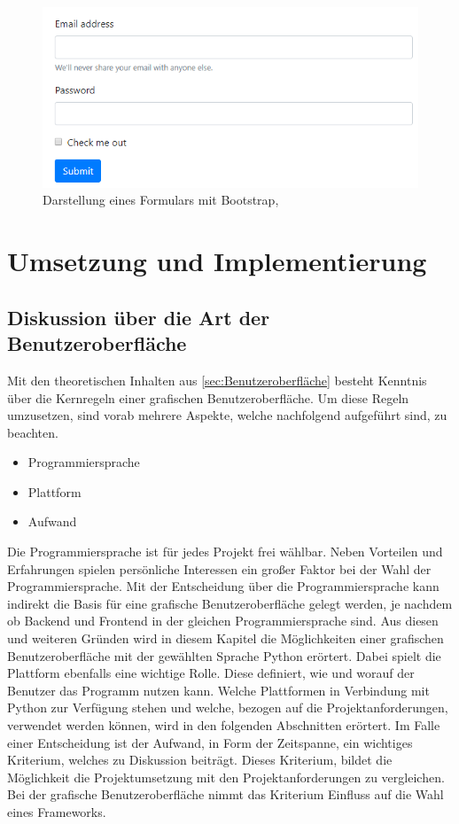 \documentclass[a4paper,titlepage,halfparskip,12pt]{scrreprt}
\begin{document}
\begin{onehalfspacing}
\begin{figure}[h]
	\centering
	\includegraphics[scale=1.0]{images/BootstrapForm}
	\caption{Darstellung eines Formulars mit Bootstrap, \cite{bootstrapOnline}} 
	\label{img:BootstrapForm}
\end{figure}
\pagebreak

\chapter{Umsetzung und Implementierung}
\label{chap:Umsetzung}

\section{Diskussion über die Art der Benutzeroberfläche}
\label{sec:DiskussionGUI}

Mit den theoretischen Inhalten aus \autoref{sec:Benutzeroberfläche} besteht Kenntnis über die Kernregeln einer grafischen Benutzeroberfläche. Um diese Regeln umzusetzen, sind vorab mehrere Aspekte, welche nachfolgend aufgeführt sind, zu beachten.
\begin{itemize}
	\item Programmiersprache
	\item Plattform
	\item Aufwand
\end{itemize}
Die Programmiersprache ist für jedes Projekt frei wählbar. Neben Vorteilen und Erfahrungen spielen persönliche Interessen ein großer Faktor bei der Wahl der Programmiersprache. Mit der Entscheidung über die Programmiersprache kann indirekt die Basis für eine grafische Benutzeroberfläche gelegt werden, je nachdem ob Backend und Frontend in der gleichen Programmiersprache sind. Aus diesen und weiteren Gründen wird in diesem Kapitel die Möglichkeiten einer grafischen Benutzeroberfläche mit der gewählten Sprache Python erörtert. Dabei spielt die Plattform ebenfalls eine wichtige Rolle. Diese definiert, wie und worauf der Benutzer das Programm nutzen kann. Welche Plattformen in Verbindung mit Python zur Verfügung stehen und welche, bezogen auf die Projektanforderungen, verwendet werden können, wird in den folgenden Abschnitten erörtert. Im Falle einer Entscheidung ist der Aufwand, in Form der Zeitspanne, ein wichtiges Kriterium, welches zu Diskussion beiträgt. Dieses Kriterium, bildet die Möglichkeit die Projektumsetzung mit den Projektanforderungen zu vergleichen. Bei der grafische Benutzeroberfläche nimmt das Kriterium Einfluss auf die Wahl eines Frameworks.


\end{onehalfspacing}
\end{document}
